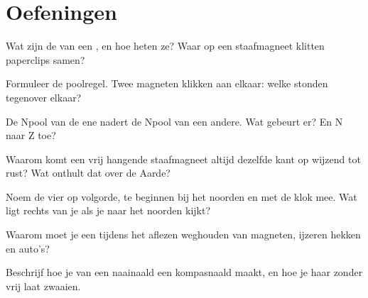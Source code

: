 \section{Oefeningen}

\begin{exercise}[$\star$]\label{exo:g4:magnets-and-compass:1}
Wat zijn de  van een , en hoe heten ze? Waar op een
staafmagneet klitten paperclips samen?
\end{exercise}

\begin{exercise}[$\star$]\label{exo:g4:magnets-and-compass:2}
Formuleer de poolregel. Twee magneten klikken aan elkaar: welke
 stonden tegenover elkaar?
\end{exercise}

\begin{exercise}[$\star$]\label{exo:g4:magnets-and-compass:3}
De Npool van de ene  nadert de Npool van een andere. Wat
gebeurt er? En N naar Z toe?
\end{exercise}

\begin{exercise}[$\star$]\label{exo:g4:magnets-and-compass:4}
Waarom komt een vrij hangende staafmagneet altijd dezelfde kant op
wijzend tot rust? Wat onthult dat over de Aarde?
\end{exercise}

\begin{exercise}[$\star$]\label{exo:g4:magnets-and-compass:5}
Noem de vier  op volgorde, te beginnen bij het noorden en
met de klok mee. Wat ligt rechts van je als je naar het noorden kijkt?
\end{exercise}

\begin{exercise}[$\star$]\label{exo:g4:magnets-and-compass:6}
Waarom moet je een  tijdens het aflezen weghouden van
magneten, ijzeren hekken en auto's?
\end{exercise}

\begin{exercise}[$\star$]\label{exo:g4:magnets-and-compass:7}
Beschrijf hoe je van een naainaald een kompasnaald maakt, en hoe je
haar zonder  vrij laat zwaaien.
\end{exercise}

